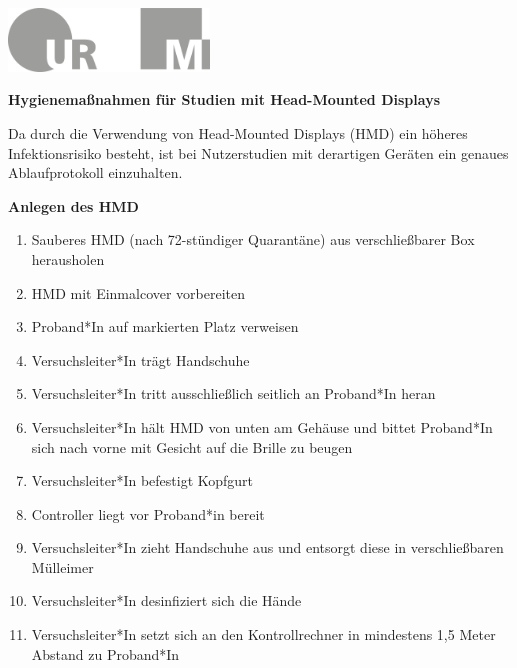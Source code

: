 \documentclass[24pt, a4paper, portrait]{article}
\begin{document}
\pagestyle{empty}

\raggedleft

\includegraphics[width=0.4\textwidth]{logo}

\vspace{1cm}
\sffamily
\centering
\huge

\textbf{Hygienemaßnahmen für Studien mit Head-Mounted Displays}

\vspace{1cm}

\raggedright
\Large

Da durch die Verwendung von Head-Mounted Displays (HMD) ein höheres Infektionsrisiko besteht, ist bei Nutzerstudien mit derartigen Geräten ein genaues Ablaufprotokoll einzuhalten.

\vspace{0.5cm}

\textbf{Anlegen des HMD}

\large

\begin{enumerate}
    \item Sauberes HMD (nach 72-stündiger Quarantäne) aus verschließbarer Box herausholen
    \item HMD mit Einmalcover vorbereiten
    \item Proband*In auf markierten Platz verweisen 
    \item Versuchsleiter*In trägt Handschuhe
    \item Versuchsleiter*In tritt ausschließlich seitlich an Proband*In heran
    \item Versuchsleiter*In hält HMD von unten am Gehäuse und bittet Proband*In sich nach vorne mit Gesicht auf die Brille zu beugen 
    \item Versuchsleiter*In befestigt Kopfgurt 
    \item Controller liegt vor Proband*in bereit 
    \item Versuchsleiter*In zieht Handschuhe aus und entsorgt diese in verschließbaren Mülleimer
    \item Versuchsleiter*In desinfiziert sich die Hände
    \item Versuchsleiter*In setzt sich an den Kontrollrechner in mindestens 1,5 Meter Abstand zu Proband*In
\end{enumerate}
\end{document}
